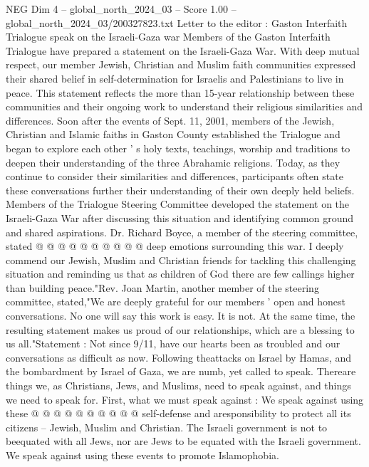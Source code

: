 \begin{textsample}{NEG Dim 4 – global\_north\_2024\_03 – Score 1.00 – global\_north\_2024\_03/200327823.txt}  \label{ex:f4_neg_219}
Letter to the editor : Gaston Interfaith Trialogue speak on the Israeli-Gaza war Members of the Gaston Interfaith Trialogue have prepared a statement on the Israeli-Gaza War.
With deep mutual respect, our member Jewish, Christian and Muslim faith communities expressed their shared belief in self-determination for Israelis and Palestinians to live in peace.
This statement reflects the more than 15-year relationship between these communities and their ongoing work to understand their religious similarities and differences.
Soon after the events of Sept. 11, 2001, members of the Jewish, Christian and Islamic faiths in Gaston County established the Trialogue and began to explore each other ' s holy texts, teachings, worship and traditions to deepen their understanding of the three Abrahamic religions.
Today, as they continue to consider their similarities and differences, participants often state these conversations further their understanding of their own deeply held beliefs.
Members of the Trialogue Steering Committee developed the statement on the Israeli-Gaza War after discussing this situation and identifying common ground and shared aspirations.
Dr.
Richard Boyce, a member of the steering committee, stated @ @ @ @ @ @ @ @ @ @ deep emotions surrounding this war.
I deeply commend our Jewish, Muslim and Christian friends for tackling this challenging situation and reminding us that as children of God there are few callings higher than building peace."Rev.
Joan Martin, another member of the steering committee, stated,"We are deeply grateful for our members ' open and honest conversations.
No one will say this work is easy.
It is not.
At the same time, the resulting statement makes us proud of our relationships, which are a blessing to us all."Statement : Not since 9/11, have our hearts been as troubled and our conversations as difficult as now.
Following theattacks on Israel by Hamas, and the bombardment by Israel of Gaza, we are numb, yet called to speak.
Thereare things we, as Christians, Jews, and Muslims, need to speak against, and things we need to speak for.
First, what we must speak against : We speak against using these @ @ @ @ @ @ @ @ @ @ self-defense and aresponsibility to protect all its citizens -- Jewish, Muslim and Christian.
The Israeli government is not to beequated with all Jews, nor are Jews to be equated with the Israeli government.
We speak against using these events to promote Islamophobia.

\end{textsample}

